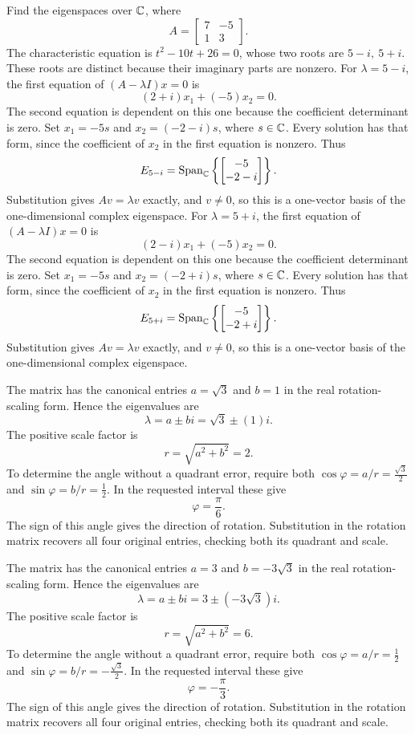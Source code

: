 \goal Find the eigenspaces over $\mathbb{C}$, where
\[A=\begin{bmatrix}7&-5\\1&3\end{bmatrix}.\]
The characteristic equation is $t^{2} - 10 t + 26=0$, whose two roots are $5 - i,\ 5 + i$. These roots are distinct because their imaginary parts are nonzero.
For $\lambda=5 - i$, the first equation of $(A-\lambda I)x=0$ is
\[(2 + i)x_1+(-5)x_2=0.\]
The second equation is dependent on this one because the coefficient determinant is zero. Set $x_1=-5s$ and $x_2=(-2 - i)s$, where $s\in\mathbb{C}$. Every solution has that form, since the coefficient of $x_2$ in the first equation is nonzero. Thus
\[E_{5 - i}=\operatorname{Span}_{\mathbb{C}}\left\{\begin{bmatrix}-5\\-2 - i\end{bmatrix}\right\}.\]
Substitution gives $Av=\lambda v$ exactly, and $v\ne0$, so this is a one-vector basis of the one-dimensional complex eigenspace.
For $\lambda=5 + i$, the first equation of $(A-\lambda I)x=0$ is
\[(2 - i)x_1+(-5)x_2=0.\]
The second equation is dependent on this one because the coefficient determinant is zero. Set $x_1=-5s$ and $x_2=(-2 + i)s$, where $s\in\mathbb{C}$. Every solution has that form, since the coefficient of $x_2$ in the first equation is nonzero. Thus
\[E_{5 + i}=\operatorname{Span}_{\mathbb{C}}\left\{\begin{bmatrix}-5\\-2 + i\end{bmatrix}\right\}.\]
Substitution gives $Av=\lambda v$ exactly, and $v\ne0$, so this is a one-vector basis of the one-dimensional complex eigenspace.


The matrix has the canonical entries $a=\sqrt{3}$ and $b=1$ in the real rotation-scaling form. Hence the eigenvalues are
\[\lambda=a\pm bi=\sqrt{3}\pm(1)i.\]
The positive scale factor is
\[r=\sqrt{a^2+b^2}=2.\]
To determine the angle without a quadrant error, require both $\cos\varphi=a/r=\frac{\sqrt{3}}{2}$ and $\sin\varphi=b/r=\frac{1}{2}$. In the requested interval these give
\[\varphi=\frac{\pi}{6}.\]
The sign of this angle gives the direction of rotation. Substitution in the rotation matrix recovers all four original entries, checking both its quadrant and scale.

The matrix has the canonical entries $a=3$ and $b=- 3 \sqrt{3}$ in the real rotation-scaling form. Hence the eigenvalues are
\[\lambda=a\pm bi=3\pm(- 3 \sqrt{3})i.\]
The positive scale factor is
\[r=\sqrt{a^2+b^2}=6.\]
To determine the angle without a quadrant error, require both $\cos\varphi=a/r=\frac{1}{2}$ and $\sin\varphi=b/r=- \frac{\sqrt{3}}{2}$. In the requested interval these give
\[\varphi=- \frac{\pi}{3}.\]
The sign of this angle gives the direction of rotation. Substitution in the rotation matrix recovers all four original entries, checking both its quadrant and scale.

